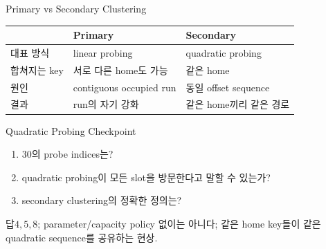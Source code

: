 \begin{frame}{Primary vs Secondary Clustering}
\small\centering\begin{tabular}{lll}\toprule
&Primary&Secondary\\\midrule
대표 방식&linear probing&quadratic probing\\
합쳐지는 key&서로 다른 home도 가능&같은 home\\
원인&contiguous occupied run&동일 offset sequence\\
결과&run의 자기 강화&같은 home끼리 같은 경로\\\bottomrule
\end{tabular}
\end{frame}
\begin{frame}{Quadratic Probing Checkpoint}
\begin{enumerate}\item 30의 probe indices는?\item quadratic probing이 모든 slot을 방문한다고 말할 수 있는가?\item secondary clustering의 정확한 정의는?\end{enumerate}
\begin{exampleblock}{답}$4,5,8$; parameter/capacity policy 없이는 아니다; 같은 home key들이 같은 quadratic sequence를 공유하는 현상.\end{exampleblock}
\end{frame}
